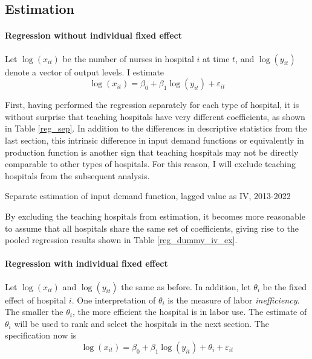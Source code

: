 \documentclass[12pt]{article}
\begin{document}
\subsection{Estimation}

\paragraph{Regression without individual fixed effect}

Let $\log(x_{it})$ be the number of nurses in hospital $i$ at time $t$, and
$\log(y_{it})$ denote a vector of output levels. I estimate
\begin{equation}
    \log(x_{it}) = \beta_0 + \beta_1 \log(y_{it}) + \varepsilon_{it}
\end{equation}

First, having performed the regression separately for each type of hospital, it
is without surprise that teaching hospitals have very different coefficients,
as shown in Table \ref{reg_sep}. In addition to the differences in descriptive
statistics from the last section, this intrinsic difference in input demand
functions or equivalently in production function is another sign that teaching
hospitals may not be directly comparable to other types of hospitals. For this
reason, I will exclude teaching hospitals from the subsequent analysis.

\begin{table}
    \centering
    
    \caption{Separate estimation of input demand function, lagged value as IV, 2013-2022}
    \label{reg_sep}
\end{table}

By excluding the teaching hospitals from estimation, it becomes more reasonable
to assume that all hospitals share the same set of coefficients, giving rise to
the pooled regression results shown in Table \ref{reg_dummy_iv_ex}.
\begin{table}
    \centering
    
    \label{reg_dummy_iv_ex}
\end{table}

\paragraph{Regression with individual fixed effect}

Let $\log(x_{it})$ and $\log(y_{it})$ the same as before. In addition, let
$\theta_i$ be the fixed effect of hospital $i$. One interpretation of
$\theta_i$ is the measure of labor \emph{inefficiency}. The smaller the
$\theta_i$, the more efficient the hospital is in labor use. The estimate of
$\theta_i$ will be used to rank and select the hospitals in the next section.
The specification now is
\begin{equation}
    \log(x_{it}) = \beta_0 + \beta_1 \log(y_{it}) + \theta_i+ \varepsilon_{it}
\end{equation}
\end{document}
